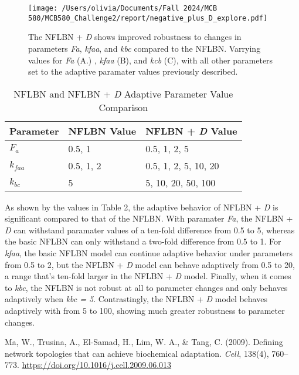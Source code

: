 \documentclass{article}
\begin{document}
\begin{figure}[H]
    \centering
    \texttt{[image: /Users/olivia/Documents/Fall 2024/MCB 580/MCB580\_Challenge2/report/negative\_plus\_D\_explore.pdf]}
    \caption{The NFLBN + \textit{D} shows improved robustness to changes in parameters \textit{Fa}, \textit{kfaa}, and \textit{kbc} compared to the NFLBN. Varrying values for \textit{Fa} (A.) , \textit{kfaa} (B), and \textit{kcb} (C), with all other parameters set to the adaptive paramater values previously described.}
    \label{fig:8}
\end{figure}

\begin{table}[h]
    \centering
    \caption{NFLBN and NFLBN + \textit{D} Adaptive Parameter Value Comparison}
    \begin{tabular}{@{}lll@{}}
        \toprule
        Parameter & NFLBN Value & NFLBN + \textit{D} Value\\ 
        \midrule
        \(F_a\) & 0.5, 1 & 0.5, 1, 2, 5\\
        \(k_{faa}\) & 0.5, 1, 2 & 0.5, 1, 2, 5, 10, 20 \\
        \(k_{bc}\) & 5 & 5, 10, 20, 50, 100\\
        \bottomrule
    \end{tabular}
    \label{tab:parameters}
\end{table}

As shown by the values in Table 2, the adaptive behavior of NFLBN + \textit{D} is significant compared to that of the NFLBN. With paramater \textit{Fa}, the NFLBN + \textit{D} can withstand paramater values of a ten-fold difference from 0.5 to 5, whereas the basic NFLBN can only withstand a two-fold difference from 0.5 to 1. For \textit{kfaa}, the basic NFLBN model can continue adaptive behavior under parameters from 0.5 to 2, but the NFLBN + \textit{D} model can behave adaptively from 0.5 to 20, a range that's ten-fold larger in the NFLBN + \textit{D} model. Finally, when it comes to \textit{kbc}, the NFLBN is not robust at all to parameter changes and only behaves adaptively when \textit{kbc = 5}. Contrastingly, the NFLBN + \textit{D} model behaves adaptively with  from 5 to 100, showing much greater robustness to parameter changes. 

\begin{thebibliography}{9}

 Ma, W., Trusina, A., El-Samad, H., Lim, W. A., \& Tang, C. (2009). Defining network topologies that can achieve biochemical adaptation. \textit{Cell}, 138(4), 760--773. \url{https://doi.org/10.1016/j.cell.2009.06.013}

\end{thebibliography}
\end{document}
